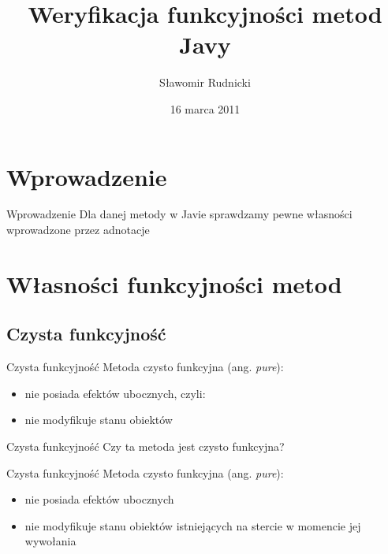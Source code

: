 \documentclass[handout]{beamer}
\title{Weryfikacja funkcyjności metod Javy}
\author{Sławomir Rudnicki}
\institute{Niezawodność systemów współbieżnych i obiektowych}
\date{16 marca 2011}
\begin{document}
\begin{frame}
  \titlepage
\end{frame}
\begin{frame}
  \tableofcontents[pausesections]
\end{frame}

\setcounter{tocdepth}{2}

\section{Wprowadzenie}

\begin{frame}{Wprowadzenie}
  Dla danej metody w Javie sprawdzamy pewne własności wprowadzone
  przez adnotacje \pause 
\end{frame}

\section{Własności funkcyjności metod}

\subsection{Czysta funkcyjność}

\begin{frame}{Czysta funkcyjność}
  Metoda czysto funkcyjna (ang. \textsl{pure}):
  \begin{itemize}
  \item nie posiada efektów ubocznych, czyli:
  \item nie modyfikuje stanu obiektów
  \end{itemize}
\end{frame}

\begin{frame}{Czysta funkcyjność}
  Czy ta metoda jest czysto funkcyjna?
  
\end{frame}

\begin{frame}{Czysta funkcyjność}
  Metoda czysto funkcyjna (ang. \textsl{pure}):
  \begin{itemize}
  \item nie posiada efektów ubocznych
  \item nie modyfikuje stanu obiektów \alert{istniejących na stercie w momencie jej wywołania}
  \end{itemize}
\end{frame}
\end{document}

